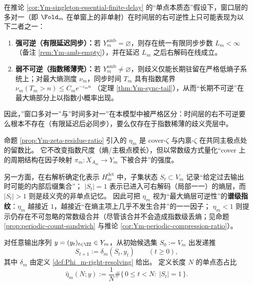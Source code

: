 \begin{corollary}\label{cor:Ym-time-layer-dichotomy}
在推论 \ref{cor:Ym-singleton-essential-finite-delay} 的“单点本质态”假设下，窗口层的多对一（即 \(\Fold_m\) 在单窗上的非单射）在时间层的右可逆性上只可能表现为以下二者之一：
\begin{enumerate}
  \item \textbf{强可逆（有限延迟同步）：}若 \(Y_m^{\mathrm{amb}}=\varnothing\)，则存在统一有限同步步数 \(L_m<\infty\)（备注 \ref{rem:Ym-amb-empty}），并在延迟 \(L_m\) 之后右解码在线成立。
  \item \textbf{弱不可逆（指数稀薄壳）：}若 \(Y_m^{\mathrm{amb}}\neq\varnothing\)，则歧义仅能长期驻留在严格低熵子系统上；对最大熵测度 \(\nu_m\)，同步时间 \(T_m\) 具有指数尾界
  \(
  \nu_m(T_m>n)\le C_m e^{-\varepsilon_m n}
  \)
（定理 \ref{thm:Ym-sync-tail}），从而“长期不可逆”在最大熵部分上以指数小概率出现。
\end{enumerate}
因此，”窗口多对一”与”时间多对一”在本模型中被严格区分：时间层的右不可逆要么根本不存在（有限延迟后必同步），要么仅存在于指数稀薄的歧义壳层中。
\end{corollary}

\begin{remark}\label{rem:eta_m_as_reversibility_certificate}
命题 \ref{prop:Ym-zeta-residue-ratio} 引入的 \(\eta_m\) 是 cover-\(\zeta\) 与内禀-\(\zeta\) 在共同主极点处的留数比。
它不改变指数尺度（熵/主极点模长），但以常数级方式量化“cover 上的周期结构在因子映射 \(\pi_m:X_{A_m}\to Y_m\) 下被合并”的强度。
\par
另一方面，在右解析确定化表示 \(H_m^{\mathrm{det}}\) 中，子集状态 \(S_t\subset V_m\) 记录“给定过去输出时可能的内部后缀集合”；
\(|S_t|=1\) 表示已进入可右解码（局部一一）的熵层，而 \(|S_t|>1\) 则是歧义壳的非单点记忆。
因此可把 \(\eta_m\) 视为“最大熵层可逆性”的\textbf{谱级指纹}：\(\eta_m\) 越接近 \(1\)，越接近“在熵主项上几乎不发生合并”的一一因子；
\(\eta_m<1\) 则提示仍存在不可忽略的常数级合并（尽管该合并不会造成指数级丢熵；见命题 \ref{prop:periodic-count-sandwich} 与推论 \ref{cor:Ym-periodic-compression-ratio}）。
\end{remark}

\begin{definition}\label{def:eta_m_hat_singleton_rate}
对任意输出序列 \(y=(y_t)_{t\in\ZZ}\in Y_m\)，从初始候选集 \(S_0:=V_m\) 出发递推
\[
S_{t+1}:=\delta_m(S_t,y_t)\qquad (t\ge 0),
\]
其中 \(\delta_m\) 由定义 \ref{def:Phi_m-right-resolving} 给出。
定义长度 \(N\) 的单点态占比
\[
\widehat\eta_m(N;y):=\frac{1}{N}\#\{\,0\le t<N:\ |S_t|=1\,\}.
\]
\end{definition}


